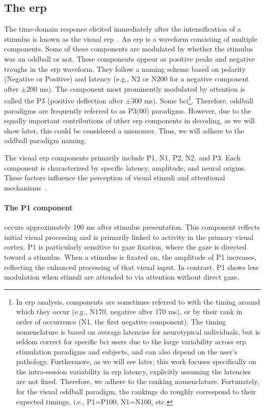 \subsection{The \acl{erp}}
\label{sec:bci/oddball/erp}

The time-domain response elicited immediately after the intensification of a stimulus is
known as the visual \ac{erp}~\cite{Luck2014}.
An \ac{erp} is a waveform consisting of multiple components.
Some of these components are modulated by whether the stimulus was an oddball or not.
These components appear as positive peaks and negative troughs in the \ac{erp} waveform.
They follow a naming scheme based on polarity (Negative or Positive) and latency (e.g.,
N2 or N200 for a negative component after $\pm200$ ms).
The component most prominently modulated by attention is called the P3 (positive
deflection after $\pm300$ ms).
Some \ac{bci}\footnote{In \ac{erp} analysis, components are sometimes referred to with
the timing around which they occur (e.g., N170, negative after 170 ms), or by their rank
in order of occurrence (N1, the first negative component).
The timing nomenclature is based on average latencies for neurotypical individuals, but
is seldom correct for specific \ac{bci} users due to the large variability across
\ac{erp} stimulation paradigms and subjects, and can also depend on the user's pathology.
Furthermore, as we will see later, this work focuses specifically on the intra-session
variability in \ac{erp} latency, explicitly assuming the latencies are not fixed.
Therefore, we adhere to the ranking nomenclature.
Fortunately, for the visual oddball paradigm, the rankings do roughly correspond to
their expected timings, i.e., P1=P100, N1=N100, etc.}.
Therefore, oddball paradigms are frequently referred to as P3(00) paradigms.
However, due to the equally important contributions of other \ac{erp} components in
decoding, as we will show later, this could be considered a misnomer.
Thus, we will adhere to the oddball paradigm naming.

The visual \ac{erp} components primarily include P1, N1, P2, N2, and P3.
Each component is characterized by specific latency, amplitude, and neural origins.
These factors influence the perception of visual stimuli and attentional
mechanisms~\cite{Luck2013}.

\paragraph{The P1 component} occurs approximately 100 ms after stimulus presentation.
This component reflects initial visual processing and is primarily linked to activity in
the primary visual cortex.
P1 is particularly sensitive to gaze fixation, where the gaze is directed toward a
stimulus.
When a stimulus is fixated on, the amplitude of P1 increases, reflecting the enhanced
processing of that visual input.
In contrast, P1 shows less modulation when stimuli are attended to via attention without
direct gaze.

